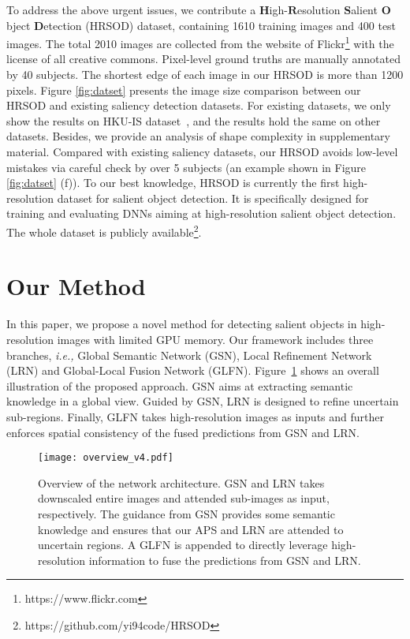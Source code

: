 \documentclass[10pt,twocolumn,letterpaper]{article}
\begin{document}
To address the above urgent issues, we contribute a $\bm{H}$igh-$\bm{R}$esolution $\bm{S}$alient $\bm{O}$bject $\bm{D}$etection (HRSOD) dataset, containing 1610 training images and 400 test images. The total 2010 images are collected from the website of Flickr\footnote{https://www.flickr.com} with the license of all creative commons. Pixel-level ground truths are manually annotated by 40 subjects. The shortest edge of each image in our HRSOD is more than 1200 pixels. Figure \ref{fig:datset} presents the image size comparison between our HRSOD and existing saliency detection datasets. For existing datasets, we only show the results on HKU-IS dataset~\cite{li2015visual}, and the results hold the same on other datasets. Besides, we provide an analysis of shape complexity in supplementary material. Compared with existing saliency datasets, our HRSOD avoids low-level mistakes via careful check by over 5 subjects (an example shown in Figure \ref{fig:datset} (f)). To our best knowledge, HRSOD is currently the first high-resolution dataset for salient
object detection. It is specifically designed for training and evaluating DNNs aiming at high-resolution salient object detection. The whole dataset is publicly available\footnote{https://github.com/yi94code/HRSOD}.
\section{Our Method}
In this paper, we propose a novel method for detecting salient objects in high-resolution images with limited GPU memory. Our framework includes three branches, \emph{i.e.,} Global Semantic Network (GSN), Local Refinement Network (LRN) and Global-Local Fusion Network (GLFN). Figure~\ref{overview} shows an overall illustration of the proposed approach. GSN aims at extracting semantic knowledge in a global view. Guided by GSN, LRN is designed to refine uncertain sub-regions. Finally, GLFN takes high-resolution images as inputs and further enforces spatial consistency of the fused predictions from GSN and LRN.
\begin{figure}[!t]
  \centering
\texttt{[image: overview\_v4.pdf]}\\
  \caption{Overview of the network architecture. GSN and LRN takes downscaled entire images and attended sub-images as input, respectively. The guidance from GSN provides some semantic knowledge and ensures that our APS and LRN are attended to uncertain regions. A GLFN is appended to directly leverage high-resolution information to fuse the predictions from GSN and LRN.}\label{overview}\vspace{-4mm}
\end{figure}
\end{document}

